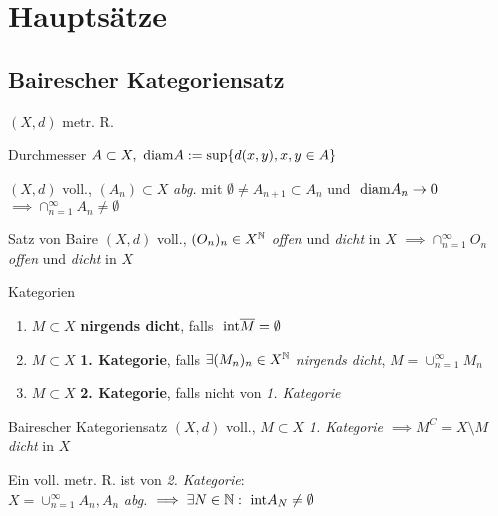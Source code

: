 \section{Hauptsätze}


\subsection{Bairescher Kategoriensatz}
  $(X,d)$ metr. R.

\begin{definition}{Durchmesser}
  $A \subset X,\text{ diam} A := \sup\{d(x,y), x,y\in A\} $
\end{definition}

\begin{lemma}
  $(X,d)$ voll., $(A_n) \subset X$ \textit{abg.} mit
  $\emptyset \neq A_{n+1} \subset A_n$ und $\text{ diam} A_n \to 0$
  $\implies \cap_{n=1}^\infty A_n \neq \emptyset$
\end{lemma}

\begin{satz}{Satz von Baire}
  $(X,d)$ voll., $(O_n)_n \in X^{\mathbb{N}}$ \textit{offen} und \textit{dicht} in
  \(X\)
  $\implies \cap_{n=1}^\infty O_n$ \textit{offen} und \textit{dicht} in \(X\)
\end{satz}

\begin{definition}{Kategorien}
  \begin{enumerate}[label = (\roman*)]
    \item $M \subset X$ \textbf{nirgends dicht},
      falls $\text{ int} \overline{M} = \emptyset$
    \item $M \subset X$ \textbf{1. Kategorie}, falls $\exists (M_n)_n \in X^{\mathbb{N}}$
      \textit{nirgends dicht}, $M = \cup_{n=1}^\infty M_n$
    \item $M \subset X$ \textbf{2. Kategorie}, falls nicht von
      \textit{1. Kategorie}
  \end{enumerate}
\end{definition}

\begin{satz}{Bairescher Kategoriensatz}
  $(X,d)$ voll., $M \subset X$ \textit{1. Kategorie} $\implies M^C = 
  X\setminus M$
  \textit{dicht} in $X$
\end{satz}

\begin{korrolar}
  Ein voll. metr. R. ist von \textit{2. Kategorie}:\\
  $X = \cup_{n=1}^\infty A_n, A_n$ \textit{abg.}
  $\implies \exists N \in \mathbb{N}: \text{ int} A_N \neq \emptyset$
\end{korrolar}


